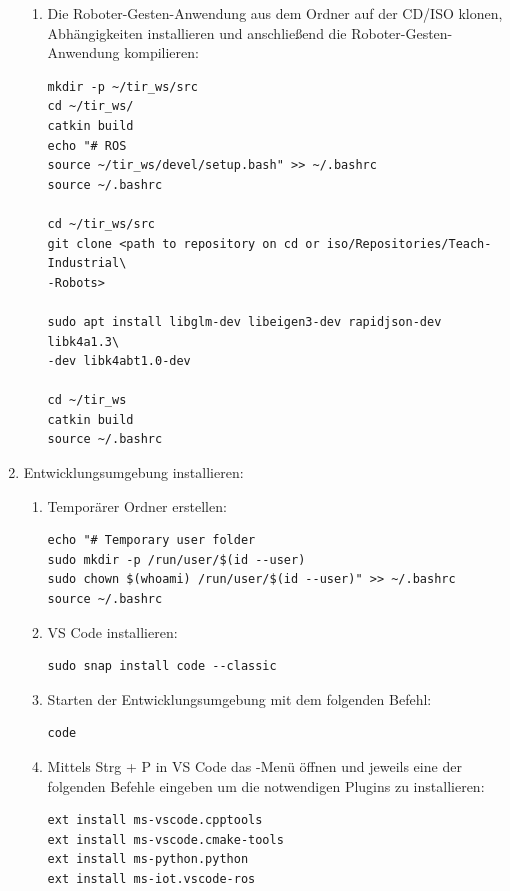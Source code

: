 \begin{enumerate}[label*=\arabic*.]
\begin{enumerate}[label*=\arabic*.]
            \item Die Roboter-Gesten-Anwendung aus dem Ordner  auf der CD/ISO klonen, Abhängigkeiten installieren und anschließend die Roboter-Gesten-Anwendung kompilieren:
                \begin{lstlisting}[style=bash]
mkdir -p ~/tir_ws/src
cd ~/tir_ws/
catkin build
echo "# ROS
source ~/tir_ws/devel/setup.bash" >> ~/.bashrc
source ~/.bashrc

cd ~/tir_ws/src
git clone <path to repository on cd or iso/Repositories/Teach-Industrial\
-Robots>

sudo apt install libglm-dev libeigen3-dev rapidjson-dev libk4a1.3\
-dev libk4abt1.0-dev

cd ~/tir_ws
catkin build
source ~/.bashrc
                \end{lstlisting}
        \end{enumerate}

    \item Entwicklungsumgebung installieren:
        \begin{enumerate}[label*=\arabic*.]
            \item Temporärer Ordner erstellen:
                \begin{lstlisting}[style=bash]
echo "# Temporary user folder
sudo mkdir -p /run/user/$(id --user)
sudo chown $(whoami) /run/user/$(id --user)" >> ~/.bashrc
source ~/.bashrc
                \end{lstlisting}

            \item VS Code installieren:
                \begin{lstlisting}[style=bash]
sudo snap install code --classic
                \end{lstlisting}

            \item Starten der Entwicklungsumgebung mit dem folgenden Befehl:
                \begin{lstlisting}[style=bash]
code
                \end{lstlisting}

            \item Mittels Strg + P in VS Code das -Menü öffnen und jeweils eine der folgenden Befehle eingeben um die notwendigen Plugins zu installieren:
                \begin{lstlisting}[style=bash]
ext install ms-vscode.cpptools
ext install ms-vscode.cmake-tools
ext install ms-python.python
ext install ms-iot.vscode-ros
                \end{lstlisting}
        \end{enumerate}


\end{enumerate}
